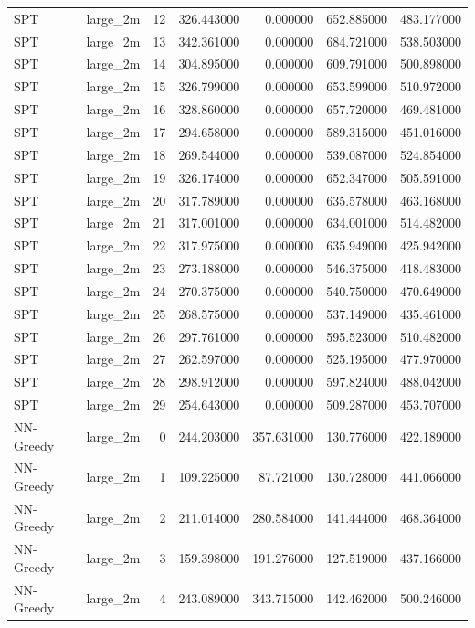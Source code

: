 \begin{tabular}{llrrrrr}
SPT & large_2m & 12 & 326.443000 & 0.000000 & 652.885000 & 483.177000 \\
SPT & large_2m & 13 & 342.361000 & 0.000000 & 684.721000 & 538.503000 \\
SPT & large_2m & 14 & 304.895000 & 0.000000 & 609.791000 & 500.898000 \\
SPT & large_2m & 15 & 326.799000 & 0.000000 & 653.599000 & 510.972000 \\
SPT & large_2m & 16 & 328.860000 & 0.000000 & 657.720000 & 469.481000 \\
SPT & large_2m & 17 & 294.658000 & 0.000000 & 589.315000 & 451.016000 \\
SPT & large_2m & 18 & 269.544000 & 0.000000 & 539.087000 & 524.854000 \\
SPT & large_2m & 19 & 326.174000 & 0.000000 & 652.347000 & 505.591000 \\
SPT & large_2m & 20 & 317.789000 & 0.000000 & 635.578000 & 463.168000 \\
SPT & large_2m & 21 & 317.001000 & 0.000000 & 634.001000 & 514.482000 \\
SPT & large_2m & 22 & 317.975000 & 0.000000 & 635.949000 & 425.942000 \\
SPT & large_2m & 23 & 273.188000 & 0.000000 & 546.375000 & 418.483000 \\
SPT & large_2m & 24 & 270.375000 & 0.000000 & 540.750000 & 470.649000 \\
SPT & large_2m & 25 & 268.575000 & 0.000000 & 537.149000 & 435.461000 \\
SPT & large_2m & 26 & 297.761000 & 0.000000 & 595.523000 & 510.482000 \\
SPT & large_2m & 27 & 262.597000 & 0.000000 & 525.195000 & 477.970000 \\
SPT & large_2m & 28 & 298.912000 & 0.000000 & 597.824000 & 488.042000 \\
SPT & large_2m & 29 & 254.643000 & 0.000000 & 509.287000 & 453.707000 \\
NN-Greedy & large_2m & 0 & 244.203000 & 357.631000 & 130.776000 & 422.189000 \\
NN-Greedy & large_2m & 1 & 109.225000 & 87.721000 & 130.728000 & 441.066000 \\
NN-Greedy & large_2m & 2 & 211.014000 & 280.584000 & 141.444000 & 468.364000 \\
NN-Greedy & large_2m & 3 & 159.398000 & 191.276000 & 127.519000 & 437.166000 \\
NN-Greedy & large_2m & 4 & 243.089000 & 343.715000 & 142.462000 & 500.246000 \\

\end{tabular}
